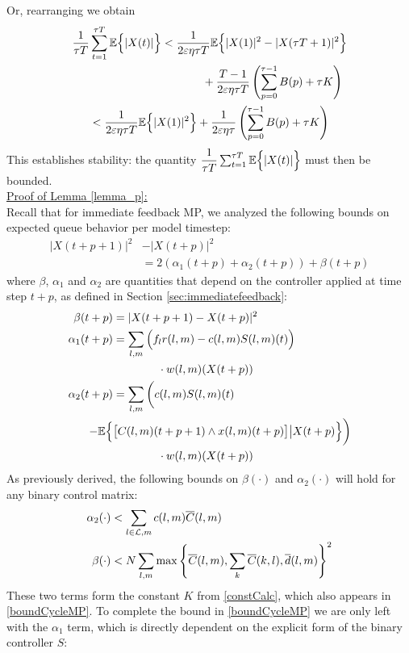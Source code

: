 Or, rearranging we obtain
\begin{align} \nonumber 
\dfrac{1}{\tau T}& \sum_{t=1}^{\tau T}  \mathbb{E}\Big\{ \vert X(t )\vert \Big\} < \dfrac{1}{2\varepsilon\eta\tau T}\mathbb{E}\Big\{ \vert X(1)\vert^2 - \vert X(\tau T + 1)\vert^2   \Big\}\\ \nonumber 
&\qquad \qquad \qquad \qquad \qquad + \dfrac{ T -1}{2\varepsilon\eta\tau T} \left(\sum_{p=0 }^{\tau - 1} B(p) + \tau K\right) \\
&< \dfrac{1}{2\varepsilon\eta\tau T}\mathbb{E}\Big\{ \vert X( 1)\vert^2 \Big\}
+ \dfrac{ 1}{2\varepsilon\eta\tau } \left(\sum_{p=0 }^{\tau - 1} B(p) + \tau K\right)
\end{align}
This establishes stability: the quantity $\dfrac{1}{\tau T}\sum_{t=1}^{\tau T} \mathbb{E}\Big\{ \vert X(t )\vert \Big\}$ must then be bounded.\\ 
\newline
\underline{Proof of Lemma \ref{lemma_p}:} \\
Recall that for immediate feedback MP, we analyzed the following bounds on expected queue behavior per model timestep:
\begin{align} \label{immediate_to_bound} 
 |X(t+ p + 1)|^{2} &- |X(t + p)|^{2} \\  \nonumber
 & = 2(\alpha_1(t + p)+\alpha_2(t + p)) + \beta(t + p)   
\end{align}
where $\beta$, $\alpha_{1}$ and $\alpha_{2}$ are quantities that depend on the controller applied at time step $t + p$, as defined in Section \ref{sec:immediatefeedback}:
\begin{align*}
\beta (t+p)  &= \vert X(t + p + 1) - X(t + p) \vert^{2} \\
\alpha_{1} (t+p) &=  \sum_{l,m} \Big(f_{l}r(l,m) - c(l,m)S(l,m)(t)\Big)\\ 
& \qquad \qquad \cdot w(l,m)(X(t + p)) \\
 \alpha_{2}  (t+p)&= \sum_{l,m} \bigg(c(l,m)S(l,m)(t) \\ 
 - \mathbb{E}\Big\{  & \big[C(l,m)(t+p + 1)\wedge x(l,m)(t + p)\big] \big| X(t + p)  \Big\}\bigg)\\
&\qquad \qquad \cdot w(l,m)(X(t + p))
 \end{align*}
As previously derived, the following bounds on $\beta(\cdot)$ and $\alpha_2(\cdot)$ will hold for any binary control matrix: 
\begin{align}
\label{a2bound_original} \alpha_2 (\cdot)&<  \sum_{l \in \linkset,m} c(l,m)\overline{C} (l,m) \\ 
\label{bbound_original} \beta (\cdot)  &<  N \displaystyle\sum_{l,m} \max\left\{ \overline{C}(l,m), \sum_{k} \overline{C}(k,l),  \overline d (l,m) \right\}^2
\end{align}
These two terms form the constant $K$ from \eqref{constCalc}, which also appears in \eqref{boundCycleMP}. To complete the bound in  \eqref{boundCycleMP} we are only left with the $\alpha_1$ term, which is directly dependent on the explicit form of the binary controller $S$:

